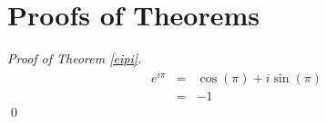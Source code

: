 \chapter{Proofs of Theorems}\label{AppA}
\begin{proof}[Proof of Theorem \ref{eipi}]
\begin{eqnarray}
e^{i\pi} &=& \cos(\pi) + i\sin(\pi)\\
&=& -1
\end{eqnarray} \qed
\end{proof}
